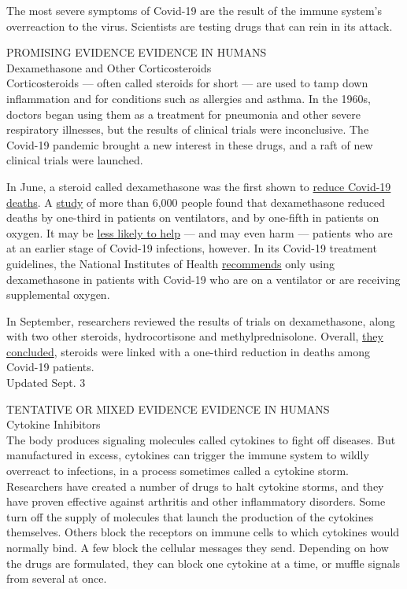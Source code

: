 The most severe symptoms of Covid-19 are the result of the immune
system's overreaction to the virus. Scientists are testing drugs that
can rein in its attack.

PROMISING EVIDENCE EVIDENCE IN HUMANS\\
Dexamethasone and Other Corticosteroids\\
Corticosteroids --- often called steroids for short --- are used to tamp
down inflammation and for conditions such as allergies and asthma. In
the 1960s, doctors began using them as a treatment for pneumonia and
other severe respiratory illnesses, but the results of clinical trials
were inconclusive. The Covid-19 pandemic brought a new interest in these
drugs, and a raft of new clinical trials were launched.

In June, a steroid called dexamethasone was the first shown to
\href{https://www.nytimes3xbfgragh.onion/2020/06/16/world/europe/dexamethasone-coronavirus-covid.html?searchResultPosition=5}{reduce
Covid-19 deaths}. A
\href{https://www.nejm.org/doi/full/10.1056/NEJMoa2021436?query=featured_home}{study}
of more than 6,000 people found that dexamethasone reduced deaths by
one-third in patients on ventilators, and by one-fifth in patients on
oxygen. It may be
\href{https://www.nytimes3xbfgragh.onion/2020/06/24/health/coronavirus-dexamethasone.html?searchResultPosition=2}{less
likely to help} --- and may even harm --- patients who are at an earlier
stage of Covid-19 infections, however. In its Covid-19 treatment
guidelines, the National Institutes of Health
\href{https://www.covid19treatmentguidelines.nih.gov/dexamethasone/}{recommends}
only using dexamethasone in patients with Covid-19 who are on a
ventilator or are receiving supplemental oxygen.

In September, researchers reviewed the results of trials on
dexamethasone, along with two other steroids, hydrocortisone and
methylprednisolone. Overall,
\href{https://www.nytimes3xbfgragh.onion/2020/09/02/health/coronavirus-steroids-who.html}{they
concluded}, steroids were linked with a one-third reduction in deaths
among Covid-19 patients.\\
Updated Sept. 3

TENTATIVE OR MIXED EVIDENCE EVIDENCE IN HUMANS\\
Cytokine Inhibitors\\
The body produces signaling molecules called cytokines to fight off
diseases. But manufactured in excess, cytokines can trigger the immune
system to wildly overreact to infections, in a process sometimes called
a cytokine storm. Researchers have created a number of drugs to halt
cytokine storms, and they have proven effective against arthritis and
other inflammatory disorders. Some turn off the supply of molecules that
launch the production of the cytokines themselves. Others block the
receptors on immune cells to which cytokines would normally bind. A few
block the cellular messages they send. Depending on how the drugs are
formulated, they can block one cytokine at a time, or muffle signals
from several at once.

